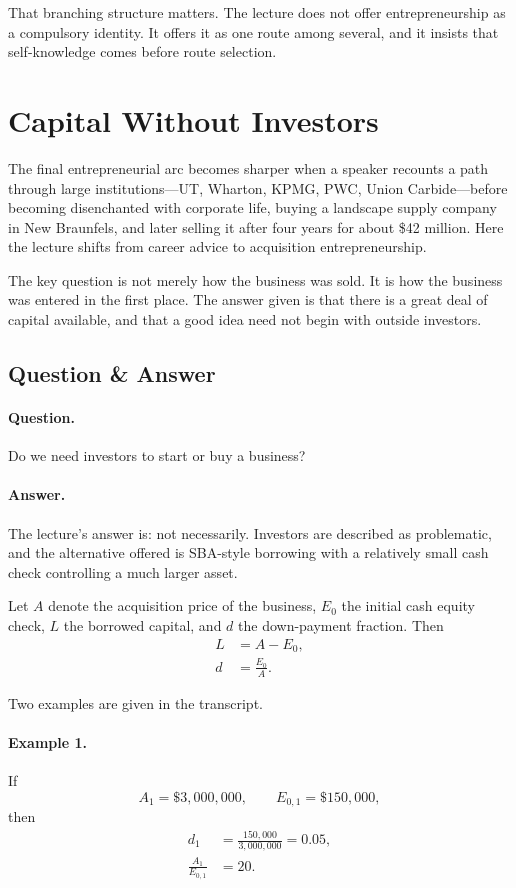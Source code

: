 That branching structure matters. The lecture does not offer entrepreneurship as a compulsory identity. It offers it as one route among several, and it insists that self-knowledge comes before route selection.

\section{Capital Without Investors}

The final entrepreneurial arc becomes sharper when a speaker recounts a path through large institutions---UT, Wharton, KPMG, PWC, Union Carbide---before becoming disenchanted with corporate life, buying a landscape supply company in New Braunfels, and later selling it after four years for about \$42 million. Here the lecture shifts from career advice to acquisition entrepreneurship.

The key question is not merely how the business was sold. It is how the business was entered in the first place. The answer given is that there is a great deal of capital available, and that a good idea need not begin with outside investors.

\subsection{Question \& Answer}

\paragraph{Question.} Do we need investors to start or buy a business?

\paragraph{Answer.} The lecture's answer is: not necessarily. Investors are described as problematic, and the alternative offered is SBA-style borrowing with a relatively small cash check controlling a much larger asset.

Let \(A\) denote the acquisition price of the business, \(E_0\) the initial cash equity check, \(L\) the borrowed capital, and \(d\) the down-payment fraction. Then
\begin{align}
L &= A - E_0, \\
d &= \frac{E_0}{A}.
\end{align}

Two examples are given in the transcript.

\paragraph{Example 1.}
If
\[
A_1 = \$3{,}000{,}000,
\qquad
E_{0,1} = \$150{,}000,
\]
then
\begin{align}
d_1 &= \frac{150{,}000}{3{,}000{,}000} = 0.05, \\
\frac{A_1}{E_{0,1}} &= 20.
\end{align}

